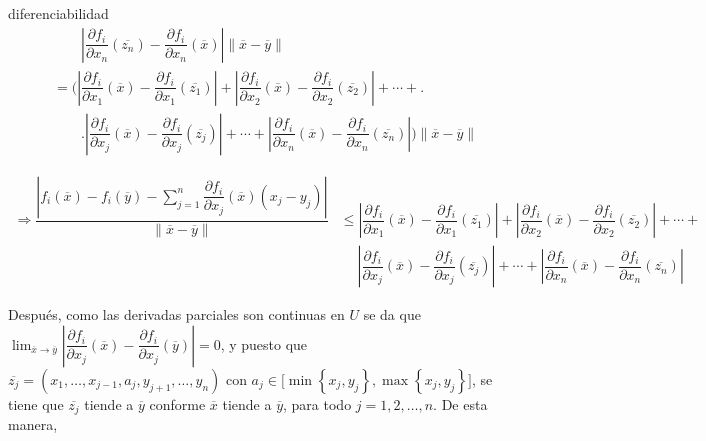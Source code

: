 \documentclass[12pt]{article}
\newenvironment{ejercicio}[1]{\begin{ejer}[breakable, pad at break = 5mm, leftrule = 0.7mm, rightrule = 0.7mm, right = 2mm, left = 2mm, enlarge bottom finally by = 3mm, fontlower = \setlength{\parskip}{2mm}]{}{#1}}{\end{ejer}}
\begin{document}
\begin{ejercicio}{diferenciabilidad}
\begin{equation*}
\begin{split}
				& \qquad \left\lvert \dfrac{\partial f_i}{\partial x_n} (\overline{z_n}) - \dfrac{\partial f_i}{\partial x_n} (\overline{x}) \right\rvert \left\lVert \overline{x} - \overline{y} \right\rVert \\
				&= \Biggl( \left\lvert \dfrac{\partial f_i}{\partial x_1} (\overline{x}) - \dfrac{\partial f_i}{\partial x_1} (\overline{z_1}) \right\rvert + \left\lvert \dfrac{\partial f_i}{\partial x_2} (\overline{x}) - \dfrac{\partial f_i}{\partial x_2} (\overline{z_2}) \right\rvert + \cdots + \Biggr. \\
				& \qquad \Biggl. \left\lvert \dfrac{\partial f_i}{\partial x_j} (\overline{x}) - \dfrac{\partial f_i}{\partial x_j} (\overline{z_j}) \right\rvert + \cdots + \left\lvert \dfrac{\partial f_i}{\partial x_n} (\overline{x}) - \dfrac{\partial f_i}{\partial x_n} (\overline{z_n}) \right\rvert \Biggr) \left\lVert \overline{x} - \overline{y} \right\rVert
			\end{split}
		\end{equation*}

		\begin{equation*}
			\begin{split}
				\Longrightarrow \dfrac{\left\lvert f_i(\overline{x}) - f_i(\overline{y}) - \displaystyle \sum_{j=1}^{n} \dfrac{\partial f_i}{\partial x_j}(\overline{x}) \left( x_j - y_j \right) \right\rvert}{\left\lVert \overline{x} - \overline{y} \right\rVert} &\leq \left\lvert \dfrac{\partial f_i}{\partial x_1} (\overline{x}) - \dfrac{\partial f_i}{\partial x_1} (\overline{z_1}) \right\rvert + \left\lvert \dfrac{\partial f_i}{\partial x_2} (\overline{x}) - \dfrac{\partial f_i}{\partial x_2} (\overline{z_2}) \right\rvert + \cdots + \\
				& \quad \; \left\lvert \dfrac{\partial f_i}{\partial x_j} (\overline{x}) - \dfrac{\partial f_i}{\partial x_j} (\overline{z_j}) \right\rvert + \cdots + \left\lvert \dfrac{\partial f_i}{\partial x_n} (\overline{x}) - \dfrac{\partial f_i}{\partial x_n} (\overline{z_n}) \right\rvert
			\end{split}
		\end{equation*}

		Después, como las derivadas parciales son continuas en $ U $ se da que $ \displaystyle \lim_{\overline{x} \to \overline{y}} \left\lvert \dfrac{\partial f_i}{\partial x_j} (\overline{x}) - \dfrac{\partial f_i}{\partial x_j} (\overline{y}) \right\rvert = 0 $, y puesto que $ \overline{z_j} = (x_1, \ldots, x_{j-1}, a_j, y_{j+1}, \ldots, y_n) $ con $ a_j \in \bigl[ \min \left\lbrace x_j, y_j \right\rbrace, \max \left\lbrace x_j, y_j \right\rbrace \bigr] $, se tiene que $ \overline{z_j} $ tiende a $ \overline{y} $ conforme $ \overline{x} $ tiende a $ \overline{y} $, para todo $ j = 1, 2, \ldots, n $. De esta manera, 


\end{ejercicio}
\end{document}
